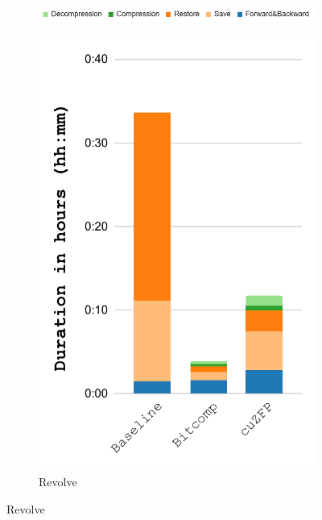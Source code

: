 \documentclass[Ingles]{ic-tese-v3}
\begin{document}
\begin{figure}[h!]
    \centering
    \begin{subfigure}{0.8\textwidth}
        \includegraphics[width=\textwidth,trim={0 0 0 0},clip]{figures/compress_breakdown/legend.png}
        \label{fig:compress_breakdown_legend}
    \end{subfigure}
    \begin{subfigure}{0.3\textwidth}
        \includegraphics[width=\textwidth,trim={0 0 0 0},clip]{figures/compress_breakdown/breakdown_compress_salt_revolve.pdf}
        \caption{Revolve}
        \label{fig:compress_breakdown_revolve}

\end{subfigure}
\end{figure}
\end{document}
